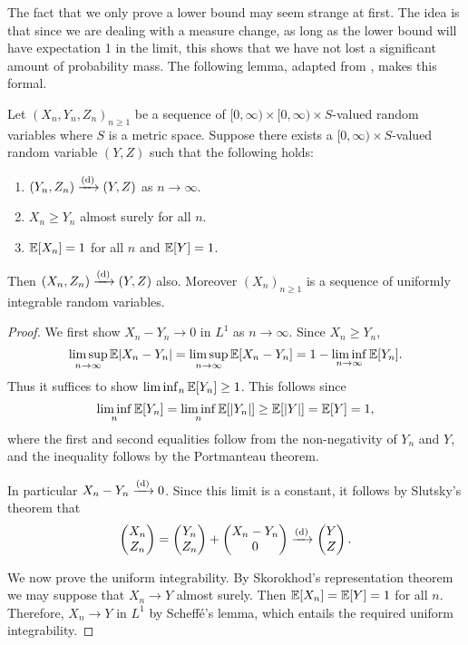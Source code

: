 The fact that we only prove a lower bound may seem strange at first. The idea is that since we are dealing with a measure change, as long as the lower bound will have expectation 1 in the limit, this shows that we have not lost a significant amount of probability mass. The following lemma, adapted from \cite[Lemma 4.8]{conchon--kerjanStableGraphMetric2020}, makes this formal.
\begin{lemma}
    \label{lem:sandwiching-lemma}
    Let $(X_n, Y_n, Z_n)_{n \geq 1}$ be a sequence of $[0, \infty) \times [0, \infty) \times S$-valued random variables where $S$ is a metric space. Suppose there exists a $[0, \infty) \times S$-valued random variable $(Y, Z)$ such that the following holds:
    \begin{enumerate}
        \item $(Y_n, Z_n) \xrightarrow[]{\mathrm{(d)}} (Y, Z)$ as $n \to \infty$.
        \item $X_n \geq Y_n$ almost surely for all $n$.
        \item ${\mathbb E}[X_n] = 1$ for all $n$ and ${\mathbb E}[Y] = 1$.
    \end{enumerate}
    Then $(X_n, Z_n) \xrightarrow[]{\mathrm{(d)}} (Y, Z)$ also. Moreover $(X_n)_{n \geq 1}$ is a sequence of uniformly integrable random variables.
\end{lemma}
\begin{proof}
    We first show $X_n - Y_n \to 0$ in $L^1$ as $n \to \infty$. Since $X_n \geq Y_n$,
    \begin{equation*}
        \limsup_{n \to \infty} {\mathbb E} \lvert X_n - Y_n\rvert
        = \limsup_{n \to \infty} {\mathbb E}[X_n - Y_n]
        = 1 - \liminf_{n \to \infty} {\mathbb E}[Y_n].
    \end{equation*}
    Thus it suffices to show $\liminf_n {\mathbb E}[Y_n] \geq 1$. This follows since
    \begin{equation*}
        \liminf_n {\mathbb E}[Y_n] =
        \liminf_n {\mathbb E}[\lvert Y_n\rvert] \geq
        {\mathbb E}[\lvert Y\rvert] =
        {\mathbb E}[Y] = 1,
    \end{equation*}
    where the first and second equalities follow from the non-negativity of $Y_n$ and $Y$, and the inequality follows by the Portmanteau theorem.

    In particular $X_n - Y_n \xrightarrow[]{\mathrm{(d)}} 0$. Since this limit is a constant, it follows by Slutsky's theorem that
    \begin{equation*}
        \begin{pmatrix} X_n \\ Z_n \end{pmatrix} = \begin{pmatrix} Y_n \\ Z_n \end{pmatrix} + \begin{pmatrix} X_n - Y_n \\ 0 \end{pmatrix} \xrightarrow[]{\mathrm{(d)}} \begin{pmatrix} Y \\ Z \end{pmatrix}.
    \end{equation*}

    We now prove the uniform integrability. By Skorokhod's representation theorem we may suppose that $X_n \to Y$ almost surely. Then ${\mathbb E}[X_n] = {\mathbb E}[Y] = 1$ for all $n$. Therefore, $X_n \to Y$ in $L^1$ by Scheffé's lemma, which entails the required uniform integrability.
\end{proof}


